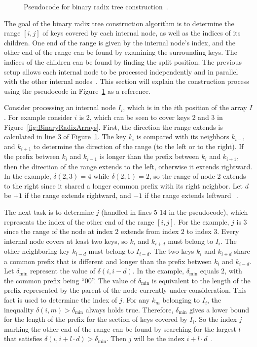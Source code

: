 \documentclass{sig-alternate}
\begin{document}
\begin{figure}
\centering
{}
\caption{Pseudocode for binary radix tree construction~\cite{Karras:2012}.}
\label{fig:PseudoCode}
\end{figure}

The goal of the binary radix tree construction algorithm is to determine the range $[i,j]$ of keys covered by each internal node, as well as the indices of its children. One end of the range is given by the internal node's index, and the other end of the range can be found by examining the surrounding keys. The indices of the children can be found by finding the split position. The previous setup allows each internal node to be processed independently and in parallel with the other internal nodes~\cite{Karras:2012}. This section will explain the construction process using the pseudocode in Figure~\ref{fig:PseudoCode} as a reference.

Consider processing an internal node $I_{i}$, which is in the $i$th position of the array $I$. For example consider $i$ is 2, which can be seen to cover keys 2 and 3 in Figure~\ref{fig:BinaryRadixArrays}. First, the direction the range extends is calculated in line 3 of Figure~\ref{fig:PseudoCode}. The key $k_i$ is compared with its neighbors $k_{i-1}$ and $k_{i+1}$ to determine the direction of the range (to the left or to the right). If the prefix between $k_i$ and $k_{i-1}$ is longer than the prefix between $k_i$ and $k_{i+1}$, then the direction of the range extends to the left, otherwise it extends rightward. In the example, $\delta(2,3) = 4$ while $\delta(2,1) = 2$, so the range of node 2 extends to the right since it shared a longer common prefix with its right neighbor. Let $d$ be $+1$ if the range extends rightward, and $-1$ if the range extends leftward ~\cite{Karras:2012}.

The next task is to determine $j$ (handled in lines 5-14 in the pseudocode), which represents the index of the other end of the range $[i,j]$. For the example, $j$ is 3 since the range of the node at index 2 extends from index 2 to index 3. Every internal node covers at least two keys, so $k_i$ and $k_{i+d}$ must belong to $I_i$. The other neighboring key $k_{i-d}$ must belong to $I_{i-d}$. The two keys $k_i$ and $k_{i+d}$ share a common prefix that is different and longer than the prefix between $k_i$ and $k_{i-d}$. Let $\delta_{\textrm{min}}$ represent the value of $\delta(i, i-d)$. In the example, $\delta_{\textrm{min}}$ equals 2, with the common prefix being ``00''. The value of $\delta_{\textrm{min}}$ is equivalent to the length of the prefix represented by the parent of the node currently under consideration. This fact is used to determine the index of $j$. For any $k_m$ belonging to $I_i$, the inequality $\delta(i,m)>\delta_{\textrm{min}}$ always holds true. Therefore, $\delta_{\textrm{min}}$ gives a lower bound for the length of the prefix for the section of keys covered by $I_i$. So the index $j$ marking the other end of the range can be found by searching for the largest $l$ that satisfies $\delta(i, i+l \cdot d)>\delta_{\textrm{min}}$. Then $j$ will be the index $i+l \cdot d$~\cite{Karras:2012}.
\end{document}
